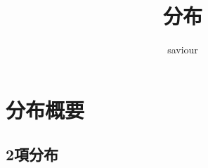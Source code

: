 



\title{分布}
\author{saviour}
\date{}




\maketitle

{
  \setcounter{tocdepth}{2}
  \tableofcontents
}

\section{分布概要}

\subsection{2項分布}

